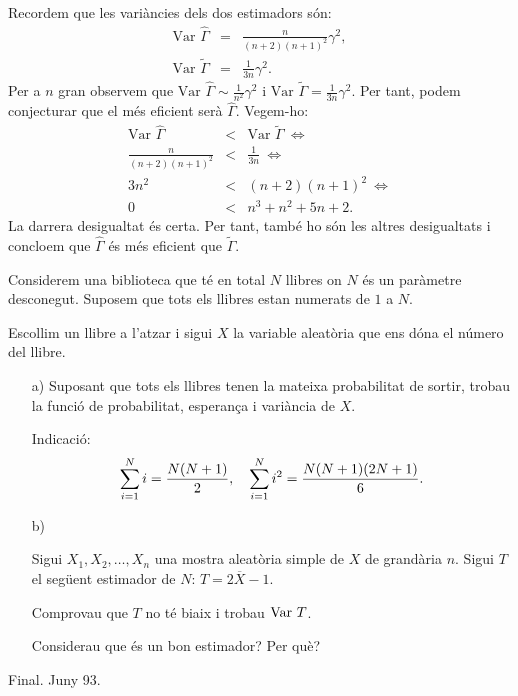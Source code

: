 {\begin{itemize}
    Recordem que les vari\`ancies dels dos estimadors s\'on:
    \begin{eqnarray*}
    	\mbox{Var }\hat{\Gamma} & = &  \frac{n}{(n+2) {(n+1)}^2} \gamma^2, \\
    	\mbox{Var }\tilde{\Gamma} & = & \frac{1}{3 n} \gamma^2.
    \end{eqnarray*}
    Per a $n$ gran observem que $\mbox{Var }\hat{\Gamma}\sim 
    \frac{1}{n^2}\gamma^2$ i $\mbox{Var }\tilde{\Gamma} = \frac{1}{3 n} 
    \gamma^2$. Per tant, podem conjecturar que el m\'es eficient ser\`a 
    $\hat{\Gamma}$. Vegem-ho:
    \begin{eqnarray*}
    	\mbox{Var }\hat{\Gamma} & < & \mbox{Var }\tilde{\Gamma}\ 
    	\Longleftrightarrow  \\
    	\frac{n}{(n+2) {(n+1)}^2} & < & \frac{1}{3 n} \ 
    	\Longleftrightarrow \\
    	3 n^2 & < & (n+2) {(n+1)}^2 \ 
    	\Longleftrightarrow  \\
    	0 & < & n^3+  n^2 + 5 n +2.
    \end{eqnarray*}
    La darrera desigualtat \'es certa. Per tant, tamb\'e ho s\'on les altres desigualtats i concloem que $\hat{\Gamma}$ \'es m\'es eficient que 
    $\tilde{\Gamma}$.
\end{itemize}}

\begin{probres}
{Considerem una biblioteca 
que t\'e en total $N$ llibres 
on $N$ \'es un par\`ametre 
desconegut. Suposem que tots els llibres estan numerats de $1$ a $N$.

Escollim un llibre a l'atzar i sigui $X$ la variable aleat\`oria que ens
d\'ona el n\'umero del llibre. 
\begin{itemize}
\item[a)] {Suposant que tots els llibres tenen la
mateixa probabilitat de sortir, trobau la funci\'o de probabilitat, 
esperan\c{c}a i vari\`ancia de $X$.}

Indicaci\'o:$$\sum_{i=1}^N i =  {N(N+1)\over 2},\quad
\sum_{i=1}^N i^2 =  {N(N+1)(2N+1)\over 6}.$$ 
\item[b)] {Sigui
$X_1,X_2,\ldots,X_n$ una mostra aleat\`oria simple de $X$ de grand\`aria $n$. Sigui
$T$ el seg\"uent estimador de $N$: $T=2\overline{X}-1$.

Comprovau que $T$ no t\'e biaix i trobau $\hbox{Var } T$.

Considerau que \'es un bon estimador? Per qu\`e?}
\end{itemize}

{\footnotesize Final. Juny 93.}}
\end{probres}

